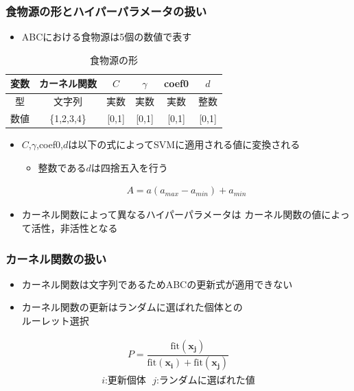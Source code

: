 \documentclass[11pt,dvipdfmx,cjk]{beamer}
\begin{document}
\begin{frame}
  \frametitle{食物源の形とハイパーパラメータの扱い}
  \begin{itemize}
  \item ABCにおける食物源は5個の数値で表す
   \end{itemize}
  \begin{table}[h]
    \centering
    \renewcommand{\arraystretch}{0.9} %
    \caption{食物源の形}
    \begin{tabular}{|c|c|c|c|c|c|}
      \hline
      変数           & カーネル関数 & $C$ &$ \gamma$ & coef0& $d$\\ \hline
      型       & 文字列              & 実数           & 実数                   & 実数           & 整数          \\ \hline
      数値          & \{1,2,3,4\}              & [0,1]           & [0,1]                  & [0,1]           & [0,1]          \\ \hline
      \end{tabular}
    
    \label{tab:variables}
    \end{table}
    \begin{itemize}
  \item $C$,$ \gamma$,coef0,$d$は以下の式によってSVMに適用される値に変換される
  \begin{itemize}
    \item 整数である$d$は四捨五入を行う
  \end{itemize}
  \begin{align*}
    \label{map}
    A =a(a_{max} -a_{min}) + a_{min}
  \end{align*}
  \item カーネル関数によって異なるハイパーパラメータは
  カーネル関数の値によって活性，非活性となる
\end{itemize}
\end{frame}
\begin{frame}
  \frametitle{カーネル関数の扱い}
  \begin{itemize}
  \item カーネル関数は文字列であるためABCの更新式が適用できない
  \item カーネル関数の更新はランダムに選ばれた個体との\\ルーレット選択 
\end{itemize}
\begin{align*}
  P = \dfrac{\mathrm{fit}(\boldsymbol{x_j})}
  {\mathrm{fit}(\boldsymbol{x_i})+\mathrm{fit}(\boldsymbol{x_j})} 
  \end{align*}
  \begin{align*}
  \text{$i$:更新個体~~$j$:ランダムに選ばれた値}
\end{align*} 
\end{frame}
\end{document}
